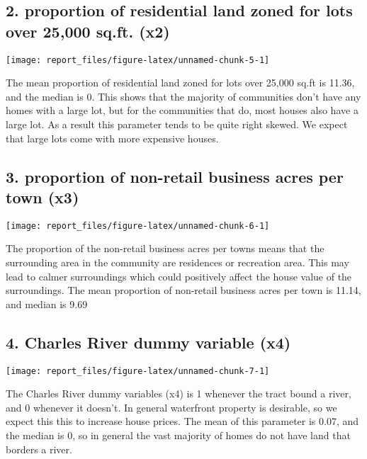 \documentclass[]{article}
\begin{document}
\subsection{2. proportion of residential land zoned for lots over 25,000
sq.ft.
(x2)}\label{proportion-of-residential-land-zoned-for-lots-over-25000-sq.ft.-x2}

\begin{center}\texttt{[image: report\_files/figure-latex/unnamed-chunk-5-1]} \end{center}

The mean proportion of residential land zoned for lots over 25,000 sq.ft
is 11.36, and the median is 0. This shows that the majority of
communities don't have any homes with a large lot, but for the
communities that do, most houses also have a large lot. As a result this
parameter tends to be quite right skewed. We expect that large lots come
with more expensive houses.

\subsection{3. proportion of non-retail business acres per town
(x3)}\label{proportion-of-non-retail-business-acres-per-town-x3}

\begin{center}\texttt{[image: report\_files/figure-latex/unnamed-chunk-6-1]} \end{center}

The proportion of the non-retail business acres per towns means that the
surrounding area in the community are residences or recreation area.
This may lead to calmer surroundings which could positively affect the
house value of the surroundings. The mean proportion of non-retail
business acres per town is 11.14, and median is 9.69

\subsection{4. Charles River dummy variable
(x4)}\label{charles-river-dummy-variable-x4}

\begin{center}\texttt{[image: report\_files/figure-latex/unnamed-chunk-7-1]} \end{center}

The Charles River dummy variables (x4) is 1 whenever the tract bound a
river, and 0 whenever it doesn't. In general waterfront property is
desirable, so we expect this this to increase house prices. The mean of
this parameter is 0.07, and the median is 0, so in general the vast
majority of homes do not have land that borders a river.
\end{document}
